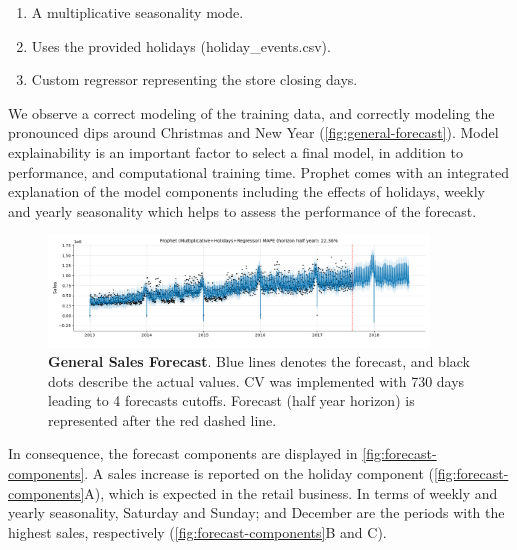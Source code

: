 \begin{enumerate}
\item A multiplicative seasonality mode.
\item Uses the provided holidays (holiday\_events.csv).
\item Custom regressor representing the store closing days.
\end{enumerate}
  
We observe a correct modeling of the training data, and correctly modeling the pronounced dips around Christmas and New Year (\autoref{fig:general-forecast}). Model explainability is an important factor to select a final model, in addition to performance, and computational training time. Prophet comes with an integrated explanation of the model components including the effects of holidays, weekly and yearly seasonality which helps to assess the performance of the forecast.

\begin{figure}[!htb]
  \centering
  \includegraphics[width=0.9\textwidth]{plots/forecast/forecast_prophet.png}
  \caption[General Sales Forecast]{\textbf{General Sales Forecast}. Blue lines denotes the forecast, and black dots describe the actual values. CV was implemented with 730 days leading to 4 forecasts cutoffs. Forecast (half year horizon) is represented after the red dashed line. }
  \label{fig:general-forecast}
\end{figure}

In consequence, the forecast components are displayed in \autoref{fig:forecast-components}. A sales increase is reported on the holiday component (\autoref{fig:forecast-components}A), which is expected in the retail business. In terms of weekly and yearly seasonality, Saturday and Sunday; and December are the periods with the highest sales, respectively (\autoref{fig:forecast-components}B and C).

